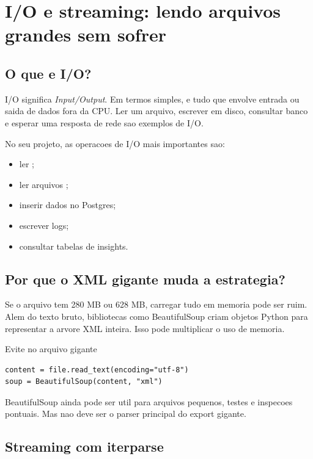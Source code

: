 \chapter{I/O e streaming: lendo arquivos grandes sem sofrer}

\section{O que e I/O?}

I/O significa \textit{Input/Output}. Em termos simples, e tudo que envolve entrada ou saida de dados fora da CPU. Ler um arquivo, escrever em disco, consultar banco e esperar uma resposta de rede sao exemplos de I/O.

No seu projeto, as operacoes de I/O mais importantes sao:

\begin{itemize}
  \item ler ;
  \item ler arquivos ;
  \item inserir dados no Postgres;
  \item escrever logs;
  \item consultar tabelas de insights.
\end{itemize}

\section{Por que o XML gigante muda a estrategia?}

Se o arquivo tem 280 MB ou 628 MB, carregar tudo em memoria pode ser ruim. Alem do texto bruto, bibliotecas como BeautifulSoup criam objetos Python para representar a arvore XML inteira. Isso pode multiplicar o uso de memoria.

\begin{warningbox}{Evite no arquivo gigante}
\begin{lstlisting}[style=devbutterpython]
content = file.read_text(encoding="utf-8")
soup = BeautifulSoup(content, "xml")
\end{lstlisting}
\end{warningbox}

BeautifulSoup ainda pode ser util para arquivos pequenos, testes e inspecoes pontuais. Mas nao deve ser o parser principal do export gigante.

\section{Streaming com iterparse}

